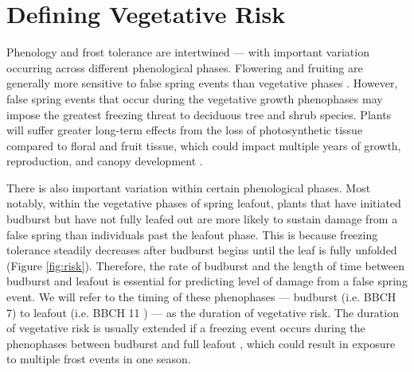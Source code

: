 \documentclass{article}\usepackage[]{graphicx}\usepackage[]{color}
\begin{document}
\section {Defining Vegetative Risk} %
Phenology and frost tolerance are intertwined --- with important variation occurring across different phenological phases. Flowering and fruiting are generally more sensitive to false spring events than vegetative phases \citep{Augspurger2009, Lenz2013}.
However, false spring events that occur during the vegetative growth phenophases may impose the greatest freezing threat to deciduous tree and shrub species. Plants will suffer greater long-term effects from the loss of photosynthetic tissue compared to floral and fruit tissue, which could impact multiple years of growth, reproduction, and canopy development \citep{Sakai1987, Vitasse2014}. 

There is also important variation within certain phenological phases. Most notably, within the vegetative phases of spring leafout, plants that have initiated budburst but have not fully leafed out are more likely to sustain damage from a false spring than individuals past the leafout phase. This is because freezing tolerance steadily decreases after budburst begins until the leaf is fully unfolded \citep{Lenz2016} (Figure \ref{fig:risk}). Therefore, the rate of budburst and the length of time between budburst and leafout is essential for predicting level of damage from a false spring event. We will refer to the timing of these phenophases --- budburst (i.e. BBCH 7) to leafout (i.e. BBCH 11 \citep{Meier2001}) --- as the duration of vegetative risk. The duration of vegetative risk is usually extended if a freezing event occurs during the phenophases between budburst and full leafout \citep{Augspurger2009}, which could result in exposure to multiple frost events in one season.
\end{document}
